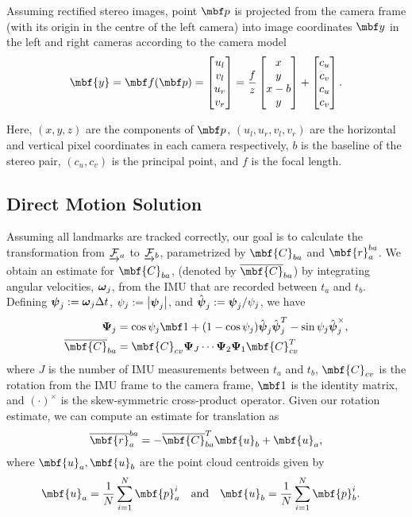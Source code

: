 \documentclass[letterpaper, 10 pt, conference]{ieeeconf}  %
\begin{document}
Assuming rectified stereo images, point $\mbf p$ is projected from the camera frame (with its origin in the centre of the left camera) into image coordinates $\mbf y$ in the left and right cameras according to the camera model
\begin{gather}
\label{eqn:imgCoord}
\mbf{y} = \mbf f (\mbf p) =  \bbm u_l \\ v_l \\ u_r \\  v_r \ebm = \frac{f}{z}
        \bbm x \\  y \\ x -  b \\  y \\
      \ebm
      +
      \bbm
      c_u \\ c_v \\ c_u \\ c_v
      \ebm.
\end{gather}

\noindent Here, $(x,y,z)$ are the components of $\mbf p$, $(u_l,u_r,v_l,v_r)$ are the horizontal and vertical pixel coordinates in each camera respectively, $b$ is the baseline of the stereo pair, $(c_u,c_v)$ is the principal point, and $f$ is the focal length.
\subsection{Direct Motion Solution}

Assuming all landmarks are tracked correctly, our goal is to calculate the transformation from $\underrightarrow{\mathcal{F}}_{a}$ to $\underrightarrow{\mathcal{F}}_{b}$, parametrized by $\mbf{C}_{ba}$ and $\mbf{r}_a^{ba}$.
We obtain an estimate for $\mbf{C}_{ba}$, (denoted by $\overline{\mbf{C}}_{ba}$) by integrating angular velocities, $\boldsymbol{\omega}_j$, from the IMU that are recorded between $t_a$ and $t_b$. 
Defining $\boldsymbol{\psi}_j := \boldsymbol{\omega}_j \Delta t$, $\psi_j := \left\vert\boldsymbol{\psi}_j\right\vert$, and $\hat{\boldsymbol{\psi}}_j := \boldsymbol{\psi}_j / \psi_j$, we have
\begin{align}
	\mbs \Psi_j &= \cos \psi_j \mbf 1 + (1 - \cos \psi_j) \mbshat \psi_j \mbshat \psi_j^T - \sin \psi_j \mbshat \psi_j^\times, \\
   \overline{\mbf{C}}_{ba} &= \mbf{C}_{cv} \mbs \Psi_{J} \cdots \mbs \Psi_2 \mbs \Psi_1 \mbf{C}_{cv}^T
\end{align}
where $J$ is the number of IMU measurements between $t_a$ and $t_b$, $\mbf {C}_{cv}$ is the rotation from the IMU frame to the camera frame, $\One$ is the identity matrix, and $(\cdot)^\times$ is the skew-symmetric cross-product operator. Given our rotation estimate, we can compute an estimate for translation as
\begin{equation} \label{eqn:cab_umeyama}
\overline{\mbf{r}}_a^{ba} = -\overline{\mbf{C}}_{ba}^T \mbf{u}_b + \mbf{u}_a,
\end{equation}
where $\mbf{u}_a, \mbf{u}_b$ are the point cloud centroids given by
\begin{align}
\mbf{u}_a &= \frac{1}{N} \sum_{i=1}^{N} \mbf{p}_a^i & \text{and} && \mbf{u}_b &= \frac{1}{N} \sum_{i=1}^{N} \mbf{p}_b^i .
\end{align}
\end{document}

